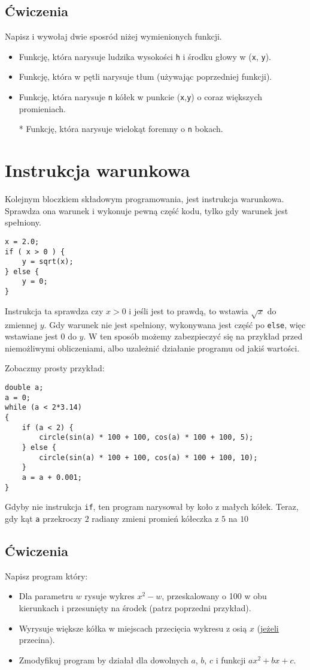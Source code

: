\documentclass{instrukcja}
\begin{document}
\subsection*{Ćwiczenia}
Napisz i wywołaj dwie sposród niżej wymienionych funkcji.
\begin{itemize}
\item Funkcję, która narysuje ludzika wysokości {\tt h} i środku głowy w ({\tt x}, {\tt y}).
\item Funkcję, która w pętli narysuje tłum (używając poprzedniej funkcji).
\item Funkcję, która narysuje {\tt n} kółek w punkcie ({\tt x},{\tt y}) o coraz większych promieniach.
\item[*] Funkcję, która narysuje wielokąt foremny o {\tt n} bokach.
\end{itemize}


\section{Instrukcja warunkowa}
Kolejnym bloczkiem składowym programowania, jest instrukcja warunkowa. Sprawdza ona warunek i wykonuje pewną część kodu, tylko gdy warunek jest spełniony.
\begin{verbatim}
x = 2.0;
if ( x > 0 ) {
    y = sqrt(x);
} else {
    y = 0;
}
\end{verbatim}
Instrukcja ta sprawdza czy $x > 0$ i jeśli jest to prawdą, to wstawia $\sqrt{x}$ do zmiennej $y$. Gdy warunek nie jest spełniony, wykonywana jest część po {\tt else}, więc wstawiane jest $0$ do $y$. W ten sposób możemy zabezpieczyć się na przykład przed niemożliwymi obliczeniami, albo uzależnić działanie programu od jakiś wartości.

Zobaczmy prosty przykład:
\begin{verbatim}
double a;
a = 0;
while (a < 2*3.14)
{
    if (a < 2) {
        circle(sin(a) * 100 + 100, cos(a) * 100 + 100, 5);
    } else {
        circle(sin(a) * 100 + 100, cos(a) * 100 + 100, 10);
    }
    a = a + 0.001;
}
\end{verbatim}
Gdyby nie instrukcja {\tt if}, ten program narysował by koło z małych kółek. Teraz, gdy kąt {\tt a} przekroczy $2$ radiany zmieni promień kółeczka z $5$ na $10$ 

\subsection*{Ćwiczenia}
Napisz program który:
\begin{itemize}
\item Dla parametru $w$ rysuje wykres $x^2-w$, przeskalowany o 100 w obu kierunkach i przesunięty na środek (patrz poprzedni przykład).
\item Wyrysuje większe kółka w miejscach przecięcia wykresu z osią $x$ (\underline{jeżeli} przecina).
\item Zmodyfikuj program by działał dla dowolnych $a$, $b$, $c$ i funkcji $ax^2+bx+c$.
\end{itemize}
\end{document}
